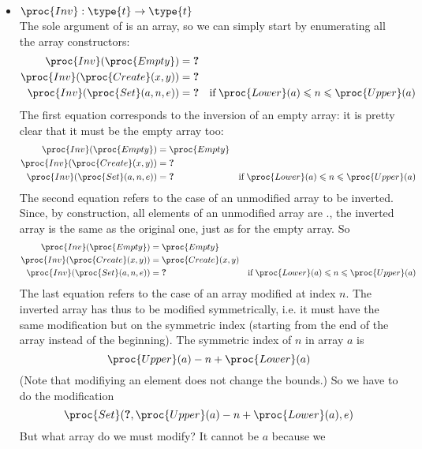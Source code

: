 \begin{itemize}
    \item \(\proc{Inv} : \type{t} \rightarrow \type{t}\)\\ 
    The sole argument of  is an array, so we can simply
    start by enumerating all the array constructors:
    \begin{align*}
       \proc{Inv} (\proc{Empty}) 
    &= \textbf{?}\\
       \proc{Inv} (\proc{Create} (x, y))
    &= \textbf{?}\\
       \proc{Inv} (\proc{Set} (a, n, e))
    &= \textbf{?}
    & \text{if} \; \proc{Lower} (a) \leqslant n \leqslant
      \proc{Upper} (a)
    \end{align*}
    The first equation corresponds to the inversion of an empty
    array: it is pretty clear that it must be the empty array too:
    \begin{align*}
       \proc{Inv} (\proc{Empty}) 
    &= \proc{Empty}\\
       \proc{Inv} (\proc{Create} (x, y))
    &= \textbf{?}\\
       \proc{Inv} (\proc{Set} (a, n, e))
    &= \textbf{?}
    & \text{if} \; \proc{Lower} (a) \leqslant n \leqslant
      \proc{Upper} (a)
    \end{align*}
    The second equation refers to the case of an unmodified array to
    be inverted. Since, by construction, all elements of an unmodified
    array are ., the inverted array is the
    same as the original one, just as for the empty array. So
    \begin{align*}
       \proc{Inv} (\proc{Empty}) 
    &= \proc{Empty}\\
       \proc{Inv} (\proc{Create} (x, y))
    &= \proc{Create} (x, y)\\
       \proc{Inv} (\proc{Set} (a, n, e))
    &= \textbf{?}
    & \text{if} \; \proc{Lower} (a) \leqslant n \leqslant
      \proc{Upper} (a)
    \end{align*}
    The last equation refers to the case of an array modified at index
    \(n\). The inverted array has thus to be modified symmetrically,
    i.e. it must have the same modification but on the symmetric index
    (starting from the end of the array instead of the beginning). The
    symmetric index of \(n\) in array \(a\) is 
    \[\proc{Upper} (a) - n + \proc{Lower} (a)\]
    (Note that modifiying an element does not change the bounds.) So
    we have to do the modification
    \[\proc{Set} (\textbf{?}, \proc{Upper} (a) - n + \proc{Lower} (a), e)\]
    But what array do we must modify? It cannot be \(a\) because we

\end{itemize}
